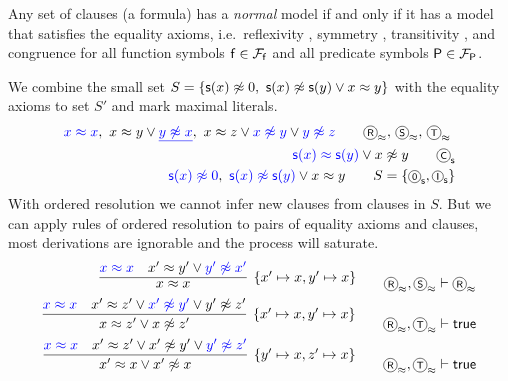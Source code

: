 \begin{theorem}\cite{Harrison:2009:HPL:1540610}
	Any set of clauses (a formula) has a \emph{normal} model
	if and only if it has a model that satisfies the
	{ equality axioms}, 
	i.e.~reflexivity , 
	symmetry , 
	transitivity ,
	and congruence  for all function symbols \( \mathsf{f}\in{\mathcal{F}_{\mathsf{f}}} \)
	and all predicate symbols \( \mathsf{P}\in{\mathcal{F}_{\mathsf{P}}} \).
\end{theorem}


\begin{example}\label{ex:nat:ordres}
	We combine the small set 
	\( S = \{ \msucc(x)\mNE 0,{\ }\msucc(x)\mNE\msucc(y)\lor x\mEQ y \} \) 
	with the equality axioms to set \( S' \) and mark maximal literals.
	\begin{align*}
	{\colN x \mEQ x},\
	x \mEQ y \lor \underline{\colN y \mNE x},\
	x \mEQ z \lor {\colN x \mNE y} \lor {\colN y\mNE z}
\tag*{\(\axiom{R}_\mEQ,\,\axiom{S}_\mEQ,\,\axiom{T}_\mEQ \) }
\\
	{\colN \msucc(x) \mEQ \msucc(y)} \lor x\mNE y
	\tag*{\(\axiom{C}_\msucc \)}
\\
	{\colN \msucc(x)\mNE 0},\
	{\colN \msucc(x) \mNE \msucc(y)} \lor x \mEQ y
\tag*{\( S = \{ \axiom{0}_\msucc, \axiom{I}_\msucc \} \)}
	\end{align*}
	With ordered resolution we cannot infer new clauses from clauses in \( S \).
	But we can apply rules of ordered resolution to pairs of equality axioms and clauses,
	most derivations are ignorable and the process will saturate.
	\begin{align*}
\infer[ \{ x'\mapsto x, y'\mapsto x\}]
{x \mEQ x}
{{\colN x \mEQ x} & x' \mEQ y' \lor {\colN y' \mNE x'}}
\tag*{\( \axiom{R}_\mEQ,\axiom{S}_\mEQ\proves \axiom{R}_\mEQ\)}
\\
\infer[ \{ x'\mapsto x,y'\mapsto x \}]
{x\mEQ z'\lor x\mNE z' }
{{\colN x \mEQ x} & x' \mEQ z' \lor {\colN x' \mNE y'} \lor {y'\mNE z'}}
\tag*{\( \axiom{R}_\mEQ,\axiom{T}_\mEQ\proves\true \)}
\\
\infer[ \{ y'\mapsto x, z'\mapsto x \}]
{x'\mEQ x\lor x'\mNE x }
{{\colN x \mEQ x} & x' \mEQ z' \lor {x' \mNE y'} \lor {\colN y'\mNE z'}}
\tag*{\( \axiom{R}_\mEQ, \axiom{T}_\mEQ\proves\true \)}
\\

\end{align*}
\end{example}
